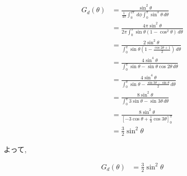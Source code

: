 \documentclass[dvipdfmx,autodetect-engine,titlepage]{jsarticle}
\begin{document}
\begin{align*}
  G_{d}(\theta) &= \frac{\sin^2\theta}{\frac{1}{4\pi}\int_{0}^{2\pi}  \,d\phi\int_{0}^{\pi}\sin^3\theta \, d\theta}\\
  &= \frac{4\pi\sin^2\theta}{2\pi\int_{0}^{\pi}\sin\theta(1-\cos^2  \theta)  \,d\theta }\\
  &= \frac{2\sin^2\theta}{\int_{0}^{\pi} \sin\theta(1-\frac{\cos2\theta+1}{2})\,d\theta }\\
  &= \frac{4\sin^4\theta}{\int_{0}^{\pi} \sin\theta - \sin\theta\cos2\theta\,d\theta}\\
  &= \frac{4\sin^4\theta}{\int_{0}^{\pi} \sin\theta - \frac{\sin3\theta-\sin\theta}{2} \,d\theta }\\
  &= \frac{8\sin^2\theta}{\int_{0}^{\pi} 3\sin\theta - \sin3\theta \,d\theta }\\
  &= \frac{8\sin^2\theta}{[-3\cos\theta+\frac{1}{3}\cos3\theta]_{0}^{\pi}}\\
  &= \frac{3}{2}\sin^2\theta
\end{align*}

よって,

\begin{align*}
  G_{d}(\theta) &= \frac{3}{2}\sin^2\theta
\end{align*}
\end{document}
